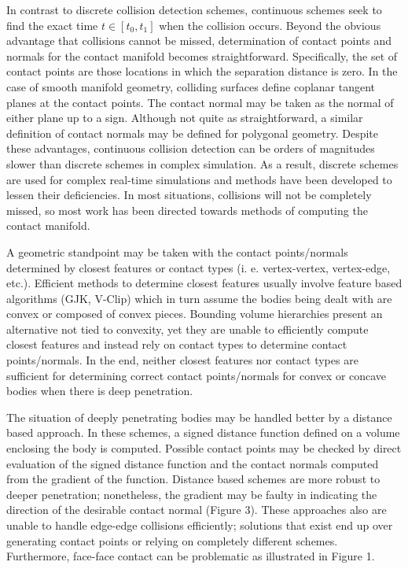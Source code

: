 \documentclass[9pt,twocolumn]{article}
\begin{document}
In contrast to discrete collision detection schemes, continuous schemes seek to find the exact time $t \in [t_0, t_1]$ when the collision occurs. Beyond the obvious advantage that collisions cannot be missed, determination of contact points and normals for the contact manifold becomes straightforward. Specifically, the set of contact points are those locations in which the separation distance is zero. In the case of smooth manifold geometry, colliding surfaces define coplanar tangent planes at the contact points. The contact normal may be taken as the normal of either plane up to a sign. Although not quite as straightforward, a similar definition of contact normals may be defined for polygonal geometry. Despite these advantages, continuous collision detection can be orders of magnitudes slower than discrete schemes in complex simulation. As a result, discrete schemes are used for complex real-time simulations and methods have been developed to lessen their deficiencies. In most situations, collisions will not be completely missed, so most work has been directed towards methods of computing the contact manifold.\newline

A geometric standpoint may be taken with the contact points/normals determined by closest features or contact types (i. e. vertex-vertex, vertex-edge, etc.). Efficient methods to determine closest features usually involve feature based algorithms (GJK, V-Clip) which in turn assume the bodies being dealt with are convex or composed of convex pieces. Bounding volume hierarchies present an alternative not tied to convexity, yet they are unable to efficiently compute closest features and instead rely on contact types to determine contact points/normals. In the end, neither closest features nor contact types are sufficient for determining correct contact points/normals for convex or concave bodies when there is deep penetration. \newline

The situation of deeply penetrating bodies may be handled better by a distance based approach. In these schemes, a signed distance function defined on a volume enclosing the body is computed. Possible contact points may be checked by direct evaluation of the signed distance function and the contact normals computed from the gradient of the function. Distance based schemes are more robust to deeper penetration; nonetheless, the gradient may be faulty in indicating the direction of the desirable contact normal (Figure 3). These approaches also are unable to handle edge-edge collisions efficiently; solutions that exist end up over generating contact points or relying on completely different schemes. Furthermore, face-face contact can be problematic as illustrated in Figure 1. \newline
\end{document}
